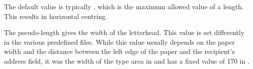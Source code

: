 The default value is typically
, which is the maximum allowed value of
a length. This results in horizontal centring.%
\EndIndexGroup


\begin{Declaration}
\end{Declaration}
The  pseudo-length gives the width of the letterhead.
This value is set differently in the various predefined 
files. While this
value usually depends on the paper width and the distance between the left
edge of the paper and the recipient's address field, it was the width of the
type area in  and has a fixed value of 170 in
.%
\EndIndexGroup


